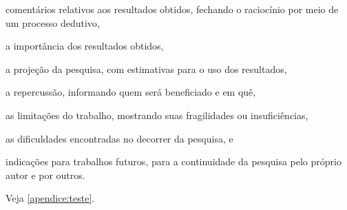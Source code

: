 \documentclass[12pt,oneside,a4paper,chapter=TITLE,section=TITLE,sumario=tradicional]{abntex2}
\begin{document}
\begin{lista}
    \item comentários relativos aos resultados obtidos, fechando o raciocínio 
    por meio de um processo dedutivo,
    
    \item a importância dos resultados obtidos,
    
    \item a projeção da pesquisa, com estimativas para o uso dos resultados,
    
    \item a repercussão, informando quem será beneficiado e em quê,
    
    \item as limitações do trabalho, mostrando suas fragilidades ou
insuficiências,
    \item as dificuldades encontradas no decorrer da pesquisa, e
    \item indicações para trabalhos futuros, para a continuidade da
pesquisa pelo próprio autor e por outros.
\end{lista}

Veja \autoref{apendice:teste}.





\end{document}
